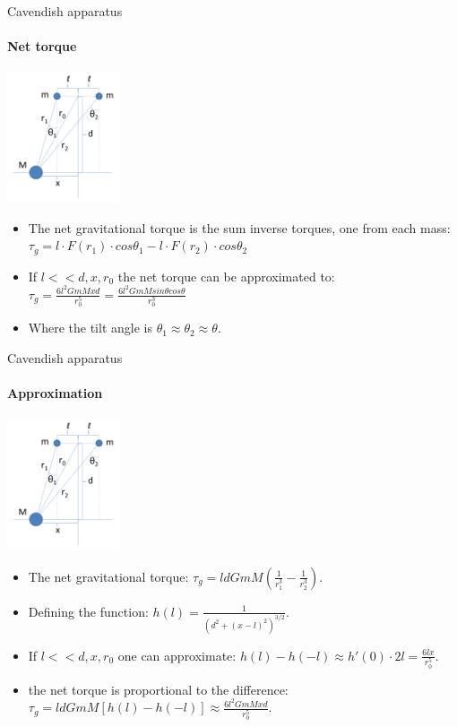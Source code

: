 \documentclass{beamer}
\begin{document}
\begin{frame}{Cavendish apparatus}
	\framesubtitle{Net torque}
	\begin{center}		
		\includegraphics[width=0.25\textwidth,keepaspectratio]{Cavendish apparatus.PNG}
    \end{center}
	\begin{itemize}
		\item The net gravitational torque is the sum inverse torques, one from each mass: $\tau_g = l \cdot F(r_1) \cdot cos\theta_1 - l \cdot F(r_2) \cdot cos\theta_2$
		\item If $l<<d,x,r_0$ the net torque can be approximated to: $\tau_g =  \frac{6l^2GmMxd} {r_0^5} = \frac{6l^2GmM sin\theta cos\theta}{r_0^3}$
		\item Where the tilt angle is $\theta_1 \approx \theta_2 \approx \theta$.
	\end{itemize}
\end{frame}
\begin{frame}{Cavendish apparatus}
	\framesubtitle{Approximation}
	\begin{center}		
		\includegraphics[width=0.25\textwidth,keepaspectratio]{Cavendish apparatus.PNG}
    \end{center}
	\begin{itemize}
		\item The net gravitational torque: $\tau_g =  l d GmM(\frac{1}{r_1^3} - \frac{1}{r_2^3})$.
		\item Defining the function: $h(l) = \frac{1}{(d^2 +(x-l)^2)^{3/2}}$.
		\item If $l<<d,x,r_0$ one can approximate: $h(l)-h(-l)\approx h'(0)\cdot 2l = \frac{6lx}{r_0^5}$.
		\item the net torque is proportional to the difference: $\tau_g = l d GmM[h(l)-h(-l)]\approx \frac{6l^2GmMxd} {r_0^5}$.
	\end{itemize}
\end{frame}
\end{document}
